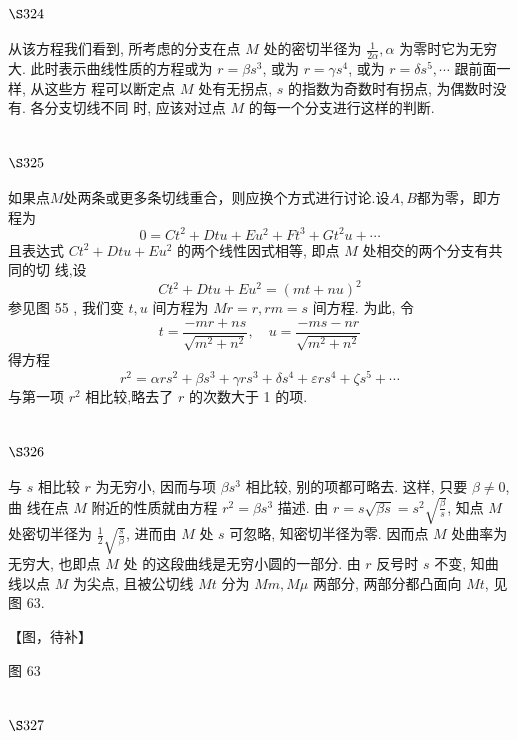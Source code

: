 \section{$\S 324$}

从该方程我们看到, 所考虑的分支在点 $M$ 处的密切半径为 $\frac{1}{2 \alpha}, \alpha$ 为零时它为无穷大. 此时表示曲线性质的方程或为 $r=\beta s^{3}$, 或为 $r=\gamma s^{4}$, 或为 $r=\delta s^{5}, \cdots$ 跟前面一样, 从这些方 程可以断定点 $M$ 处有无拐点, $s$ 的指数为奇数时有拐点, 为偶数时没有. 各分支切线不同 时, 应该对过点 $M$ 的每一个分支进行这样的判断. 

\section{$\S 325$}
如果点$M$处两条或更多条切线重合，则应换个方式进行讨论.设$A,B$都为零，即方程为
\[
0=C t^{2}+D t u+E u^{2}+F t^{3}+G t^{2} u+\cdots
\]
且表达式 $C t^{2}+D t u+E u^{2}$ 的两个线性因式相等, 即点 $M$ 处相交的两个分支有共同的切 线,设
\[
C t^{2}+D t u+E u^{2}=(m t+n u)^{2}
\]
参见图 55 , 我们变 $t, u$ 间方程为 $M r=r, r m=s$ 间方程. 为此, 令
\[
t=\frac{-m r+n s}{\sqrt{m^{2}+n^{2}}}, \quad u=\frac{-m s-n r}{\sqrt{m^{2}+n^{2}}}
\]
得方程
\[
r^{2}=\alpha r s^{2}+\beta s^{3}+\gamma r s^{3}+\delta s^{4}+\varepsilon r s^{4}+\zeta s^{5}+\cdots
\]
与第一项 $r^{2}$ 相比较,略去了 $r$ 的次数大于 1 的项.

\section{$\S 326$}

与 $s$ 相比较 $r$ 为无穷小, 因而与项 $\beta s^{3}$ 相比较, 别的项都可略去. 这样, 只要 $\beta \neq 0$, 曲 线在点 $M$ 附近的性质就由方程 $r^{2}=\beta s^{3}$ 描述. 由 $r=s \sqrt{\beta s}=s^{2} \sqrt{\frac{\beta}{s}}$, 知点 $M$ 处密切半径为 $\frac{1}{2} \sqrt{\frac{s}{\beta}}$, 进而由 $M$ 处 $s$ 可忽略, 知密切半径为零. 因而点 $M$ 处曲率为无穷大, 也即点 $M$ 处 的这段曲线是无穷小圆的一部分. 由 $r$ 反号时 $s$ 不变, 知曲线以点 $M$ 为尖点, 且被公切线 $M t$ 分为 $M m, M \mu$ 两部分, 两部分都凸面向 $M t$, 见图 63.


【图，待补】

图 63

\section{$\S 327$}


